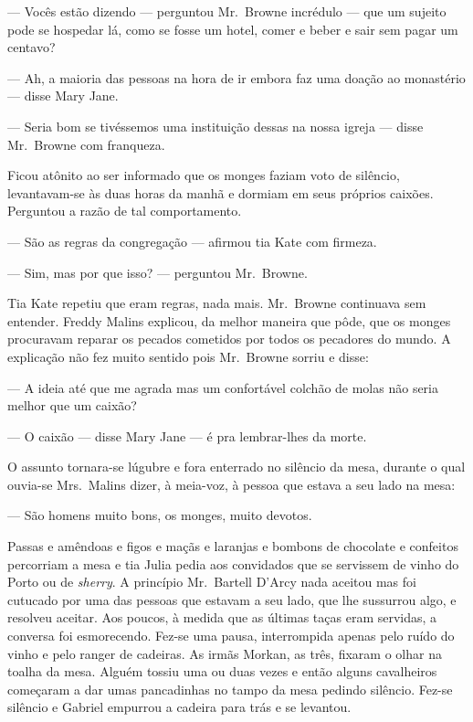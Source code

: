 --- Vocês estão dizendo --- perguntou Mr.~Browne incrédulo --- que um sujeito
pode se hospedar lá, como se fosse um hotel, comer e beber e sair sem pagar um
centavo?

--- Ah, a maioria das pessoas na hora de ir embora faz uma doação ao monastério
--- disse Mary Jane.

--- Seria bom se tivéssemos uma instituição dessas na nossa igreja --- disse
Mr.~Browne com franqueza.

Ficou atônito ao ser informado que os monges faziam voto de silêncio,
levantavam-se às duas horas da manhã e dormiam em seus próprios caixões.
Perguntou a razão de tal comportamento.

--- São as regras da congregação --- afirmou tia Kate com firmeza.

--- Sim, mas por que isso? --- perguntou Mr.~Browne.

Tia Kate repetiu que eram regras, nada mais.  Mr.~Browne continuava sem
entender.  Freddy Malins explicou, da melhor maneira que pôde, que os monges
procuravam reparar os pecados cometidos por todos os pecadores do mundo.  A
explicação não fez muito sentido pois Mr.~Browne sorriu e disse:

--- A ideia até que me agrada mas um confortável colchão de molas não seria
melhor que um caixão?

--- O caixão --- disse Mary Jane --- é pra lembrar-lhes da morte.

O assunto tornara-se lúgubre e fora enterrado no silêncio da mesa, durante o
qual ouvia-se Mrs.~Malins dizer, à meia-voz, à pessoa que estava a seu lado na
mesa:

--- São homens muito bons, os monges, muito devotos.

Passas e amêndoas e figos e maçãs e laranjas e bombons de chocolate e confeitos
percorriam a mesa e tia Julia pedia aos convidados que se servissem de vinho do
Porto ou de \textit{sherry}.  A princípio Mr.~Bartell D’Arcy nada aceitou mas foi
cutucado por uma das pessoas que estavam a seu lado, que lhe sussurrou algo, e
resolveu aceitar.  Aos poucos, à medida que as últimas taças eram servidas, a
conversa foi esmorecendo.  Fez-se uma pausa, interrompida apenas pelo ruído do
vinho e pelo ranger de cadeiras.  As irmãs Morkan, as três, fixaram o olhar na
toalha da mesa.  Alguém tossiu uma ou duas vezes e então alguns cavalheiros
começaram a dar umas pancadinhas no tampo da mesa pedindo silêncio.  Fez-se
silêncio e Gabriel empurrou a cadeira para trás e se levantou.

